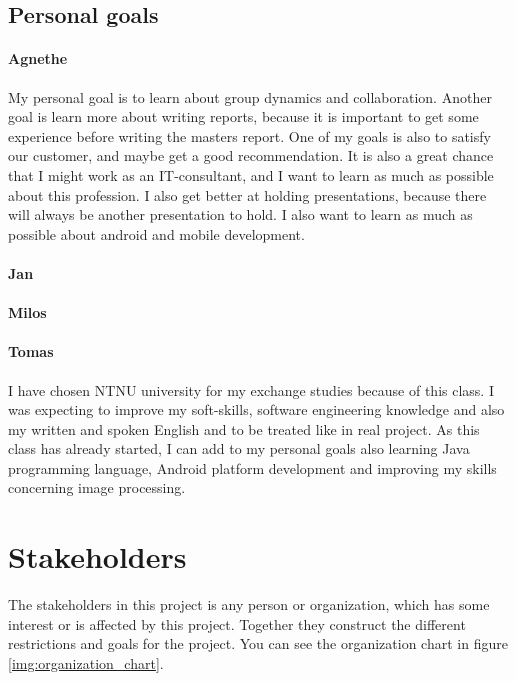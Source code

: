 \subsection{Personal goals}
\paragraph{Agnethe}

My personal goal is to learn about group dynamics and collaboration. Another goal is learn more about writing reports, because it is important to get some experience before writing the masters report. One of my goals is also to  satisfy our customer, and maybe get a good recommendation. It is also a great chance that I might work as an IT-consultant, and I want to learn as much as possible about this profession. I also  get better at holding presentations, because there will always be another presentation to hold. I also want to learn as much as possible about android and mobile development.

\paragraph{Jan}
\paragraph{Milos}
\paragraph{Tomas}
I have chosen NTNU university for my exchange studies because of this class. 
I was expecting to improve my soft-skills, software engineering knowledge and also my written and spoken English and to be treated like in real project.
As this class has already started, I can add to my personal goals also learning Java programming language,
Android platform development and improving my skills concerning image processing.

\section{Stakeholders}

The stakeholders in this project is any person or organization, which has some interest or is affected by this project. Together they construct the different restrictions and goals for the project. 
You can see the organization chart in figure \ref{img:organization_chart}.


